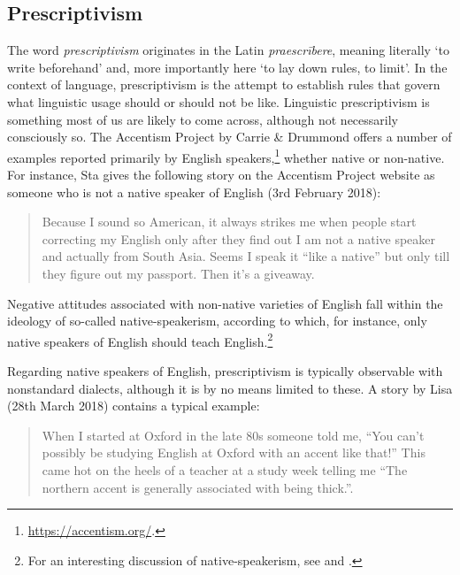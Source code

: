\subsection{Prescriptivism}\label{prescriptivism}
The word \textit{prescriptivism} originates in the Latin \textit{praescrībere}, meaning literally `to write beforehand' and, more importantly here `to lay down rules, to limit'. In the context of language, prescriptivism is the attempt to establish rules that govern what linguistic usage should or should not be like. Linguistic prescriptivism is something most of us are likely to come across, although not necessarily consciously so. The Accentism Project by Carrie \& Drummond offers a number of examples reported primarily by English speakers,\footnote{\url{https://accentism.org/}.} whether native or non-native. For instance, Sta gives the following story on the Accentism Project website as someone who is not a native speaker of English (3rd February 2018):

\begin{quote}
    Because I sound so American, it always strikes me when people start correcting my English only after they find out I am not a native speaker and actually from South Asia. Seems I speak it ``like a native'' but only till they figure out my passport. Then it's a giveaway.
\end{quote}

\noindent Negative attitudes associated with non-native varieties of English fall within the ideology of so-called native-speakerism, according to which, for instance, only native speakers of English should teach English.\footnote{For an interesting discussion of native-speakerism, see \citet{Jenkins2006} and \citet{FirthWagner1997}.}

Regarding native speakers of English, prescriptivism is typically observable with nonstandard dialects, although it is by no means limited to these. A story by Lisa (28th March 2018) contains a typical example:

\begin{quote}
    When I started at Oxford in the late 80s someone told me, ``You can't possibly be studying English at Oxford with an accent like that!'' This came hot on the heels of a teacher at a study week telling me ``The northern accent is generally associated with being thick.{''}.
\end{quote}


